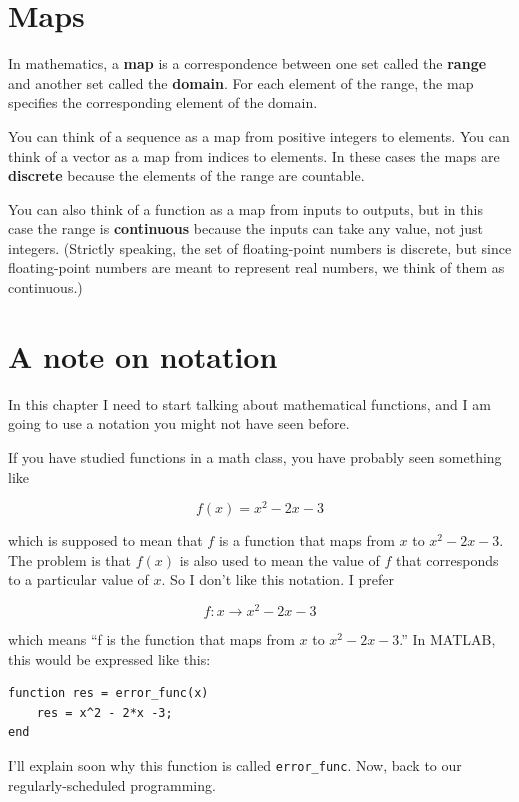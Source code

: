 \documentclass{book}
\begin{document}
\section{Maps}
\label{map}

In mathematics, a {\bf map} is a correspondence between one
set called the {\bf range} and another set called the
{\bf domain}.  For each element of the range, the map specifies
the corresponding element of the domain.

You can think of a sequence as a map from positive integers
to elements.  You can think of a vector
as a map from indices to elements.  In these cases the maps
are {\bf discrete} because the elements of the range are countable.

You can also think of a function as a map from inputs to outputs, but
in this case the range is {\bf continuous} because the inputs can take
any value, not just integers.  (Strictly speaking, the set of
floating-point numbers is discrete, but since floating-point numbers
are meant to represent real numbers, we think of them as continuous.)


\section{A note on notation}
\label{notation}

In this chapter I need to start talking about mathematical
functions, and I am going to use a notation you might not have
seen before.

If you have studied functions in a math class, you have probably
seen something like

\[ f(x) = x^2 - 2x -3 \]

which is supposed to mean that $f$ is a function that maps from
$x$ to $x^2 - 2x -3$.  The problem is that $f(x)$ is also used to mean
the value of $f$ that corresponds to a particular value of $x$.  So I
don't like this notation.  I prefer

\[ f : x \to x^2 - 2x -3 \]

which means ``f is the function that maps from
$x$ to $x^2 - 2x -3$.''  In MATLAB, this would be expressed
like this:

\begin{verbatim}
function res = error_func(x)
    res = x^2 - 2*x -3;
end
\end{verbatim}

I'll explain soon why this function is called {\tt error\_func}.
Now, back to our regularly-scheduled programming.
\end{document}
